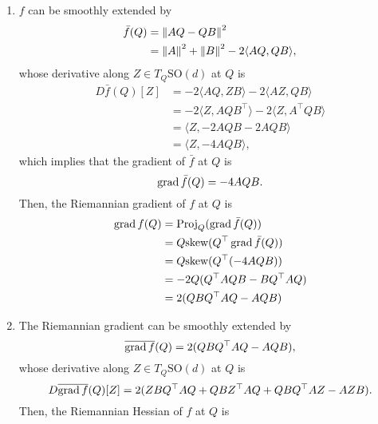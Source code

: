 \documentclass[en, oneside]{assignment}
\begin{document}
\begin{sol}
    \begin{enumerate}[label=(\arabic*)]
        \item $f$ can be smoothly extended by
        \begin{align*}
            \bar f(Q) &= \left\lVert AQ - QB\right\rVert^2\\
            &= \left\lVert A\right\rVert^2 + \left\lVert B\right\rVert^2 - 2\langle AQ, QB \rangle,
        \end{align*}
        whose derivative along $Z \in T_Q \text{SO}(d)$ at $Q$ is
        \begin{align*}
            D \bar f(Q) [Z] &= -2\langle AQ, ZB \rangle - 2\langle AZ, QB \rangle\\
            &= -2\langle Z, A Q B^\top \rangle - 2\langle Z, A^\top Q B \rangle\\
            &= \langle Z, -2A Q B - 2A Q B \rangle\\
            &= \langle Z, -4A Q B \rangle,
        \end{align*}
        which implies that the gradient of $\bar f$ at $Q$ is
        \begin{equation*}
            \operatorname{grad} \bar f(Q) = -4A Q B.
        \end{equation*}
        Then, the Riemannian gradient of $f$ at $Q$ is
        \begin{align*}
            \operatorname{grad} f(Q) &= \operatorname{Proj}_Q (\operatorname{grad} \bar f(Q))\\
            &= Q \text{skew}(Q^\top \operatorname{grad} \bar f(Q))\\
            &= Q \text{skew}(Q^\top (-4A Q B))\\
            &= -2Q (Q^\top A Q B - B Q^\top A Q)\\
            &= 2(Q B Q^\top A Q - A Q B)
        \end{align*}
        \item The Riemannian gradient can be smoothly extended by
        \begin{equation*}
            \overline {\operatorname{grad} f}(Q) = 2(Q B Q^\top A Q - A Q B),
        \end{equation*}
        whose derivative along $Z \in T_Q \text{SO}(d)$ at $Q$ is
        \begin{equation*}
            D \overline {\operatorname{grad} f}(Q) [Z] = 2(Z B Q^\top A Q + Q B Z^\top A Q + Q B Q^\top A Z - A Z B).
        \end{equation*}
        Then, the Riemannian Hessian of $f$ at $Q$ is
        \begin{equation*}

\end{equation*}
\end{enumerate}
\end{sol}
\end{document}
